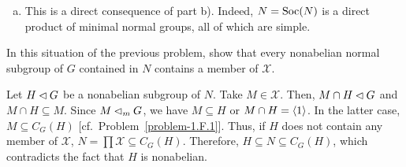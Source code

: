 \begin{solution}
\begin{enumerate}[a),font=\upshape]
\begin{proof}
\begin{enumerate}[i),font=\upshape]
        \item To prove that $N\subseteq\Soc(N)$ we proceed by induction on the number of elements of $\mathcal Y$ (notation defined in part~a). The case $|{\mathcal Y}|=1$ is covered by part i). Assume that $|{\mathcal Y}|>1$ and pick $M\in\mathcal Y$ to define ${\mathcal Y}'={\mathcal Y}\setminus\set M$. According to the inductive hypothesis and the lemma
        $$
            \Soc\Big(\prod{\mathcal Y}'\Big)\Soc(M)=\Big(\prod{\mathcal Y'}\Big)M.
        $$
        Since the RHS is a direct product because $\prod{\mathcal Y}'\cap M=\gen1$, the same holds for the LHS. Moreover, the RHS equals $\prod\mathcal Y$, which is nothing but $N$. Using part iv), we get
        $$
            \Soc(N)
                =\Soc\Big(\prod{\mathcal Y}'\times M\Big)
                \supseteq\Soc\Big(\prod{\mathcal Y}'\Big)\times\Soc(M) = N.
        $$
    \end{enumerate}
    \end{proof}

    Now that we have established the hint, let's consider our problem, namely $M\normal_m N\implies M$ simple. Since $N=\Soc(N)$, we may assume that $N=MH$, where $H$ is the product of other minimal normal subgroups of~$N$, all having trivial intersection with $M$. Given that the product is direct, we have $M\leftrightarrow H$. Thus, if $\gen1\ne L\normal M$, we have $L\normal MH=N$ because $L\leftrightarrow H$ too. The minimality of $M$ in $N$ can be invoked to conclude that $L=M$. Thus $M$ has no proper normal subgroups, i.e., is simple.
    
    \item This is a direct consequence of part b). Indeed, $N=\Soc(N)$ is a direct product of minimal normal groups, all of which are simple.
\end{enumerate}
\end{solution}

\begin{probl}\label{problem-2.A.6}
    In this situation of the previous problem, show that every nonabelian normal subgroup of\/ $G$ contained in\/ $N$ contains a member of\/ $\mathcal X$.
\end{probl}

\begin{solution} Let $H\lhd G$ be a nonabelian subgroup of $N$. Take $M\in\mathcal X$. Then, $M\cap H\lhd G$ and $M\cap H\subseteq M$. Since $M\lhd_mG$, we have $M\subseteq H$ or $M\cap H=\langle1\rangle$. In the latter case, $M\subseteq C_G(H)$ [cf.~Problem~\ref{problem-1.F.1}]. Thus, if $H$ does not contain any member of $\mathcal X$, $N=\prod{\mathcal X}\subseteq C_G(H)$. Therefore, $H\subseteq N\subseteq C_G(H)$, which contradicts the fact that $H$ is nonabelian.  \end{solution}


